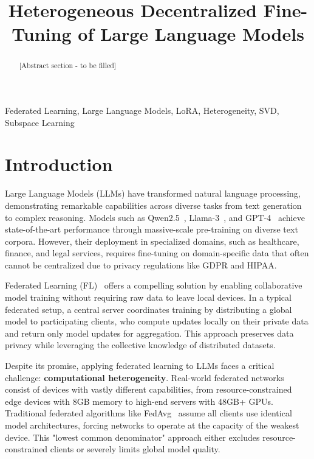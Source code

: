 \documentclass[conference]{IEEEtran}
\begin{document}
\title{Heterogeneous Decentralized Fine-Tuning of Large Language Models}

\author{
}

\maketitle

\begin{abstract}
[Abstract section - to be filled]
\end{abstract}

\begin{IEEEkeywords}
Federated Learning, Large Language Models, LoRA, Heterogeneity, SVD, Subspace Learning
\end{IEEEkeywords}

\section{Introduction}
\label{sec:intro}

Large Language Models (LLMs) have transformed natural language processing, demonstrating remarkable capabilities across diverse tasks from text generation to complex reasoning. Models such as Qwen2.5~\cite{qwen2024}, Llama-3~\cite{llama2023}, and GPT-4~\cite{gpt42023} achieve state-of-the-art performance through massive-scale pre-training on diverse text corpora. However, their deployment in specialized domains, such as healthcare, finance, and legal services, requires fine-tuning on domain-specific data that often cannot be centralized due to privacy regulations like GDPR and HIPAA.

Federated Learning (FL)~\cite{mcmahan2017fedavg} offers a compelling solution by enabling collaborative model training without requiring raw data to leave local devices. In a typical federated setup, a central server coordinates training by distributing a global model to participating clients, who compute updates locally on their private data and return only model updates for aggregation. This approach preserves data privacy while leveraging the collective knowledge of distributed datasets.

Despite its promise, applying federated learning to LLMs faces a critical challenge: \textbf{computational heterogeneity}. Real-world federated networks consist of devices with vastly different capabilities, from resource-constrained edge devices with 8GB memory to high-end servers with 48GB+ GPUs. Traditional federated algorithms like FedAvg~\cite{mcmahan2017fedavg} assume all clients use identical model architectures, forcing networks to operate at the capacity of the weakest device. This "lowest common denominator" approach either excludes resource-constrained clients or severely limits global model quality.
\end{document}
